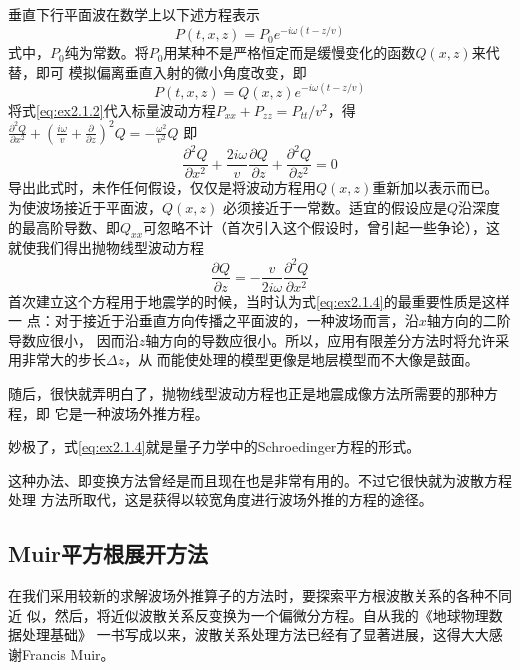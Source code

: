 垂直下行平面波在数学上以下述方程表示
\begin{equation}
P(t,x,z)=P_0e^{-i\omega (t-z/v)}
\label{eq:ex2.1.1}
\end{equation}
式中，$P_0$纯为常数。将$P_0$用某种不是严格恒定而是缓慢变化的函数$Q(x,z)$来代替，即可
模拟偏离垂直入射的微小角度改变，即
\begin{equation}
P(t,x,z)=Q(x,z)e^{-i\omega (t-z/v)}
\label{eq:ex2.1.2}
\end{equation}
将式\ref{eq:ex2.1.2}代入标量波动方程$P_{xx}+P_{zz}=P_{tt}/v^2$，得
$\frac{\partial^2 Q }{\partial x^2}+(\frac{i\omega}{v}+\frac{\partial}{\partial z})^2Q
=-\frac{\omega^2}{v^2}Q$
即
\begin{equation}
\frac{\partial^2 Q }{\partial x^2}+\frac{2i\omega}{v}\frac{\partial Q}{\partial z}+\frac{\partial^2 Q}
{\partial z^2}=0
\label{eq:ex2.1.3}
\end{equation}
导出此式时，未作任何假设，仅仅是将波动方程用$Q(x,z)$重新加以表示而已。为使波场接近于平面波，$Q(x,z)$
必须接近于一常数。适宜的假设应是$Q$沿深度的最高阶导数、即$Q_{xx}$可忽略不计（首次引入这个假设时，曾引起一些争论），这就使我们得出抛物线型波动方程
\begin{equation}
\frac{\partial Q }{\partial z}=-\frac{v}{2i\omega}\frac{\partial^2 Q }{\partial x^2}
\label{eq:ex2.1.4}
\end{equation}
首次建立这个方程用于地震学的时候，当时认为式\ref{eq:ex2.1.4}的最重要性质是这样一
点：对于接近于沿垂直方向传播之平面波的，一种波场而言，沿$x$轴方向的二阶导数应很小，
因而沿$z$轴方向的导数应很小。所以，应用有限差分方法时将允许采用非常大的步长$\Delta z$，从
而能使处理的模型更像是地层模型而不大像是鼓面。

随后，很快就弄明白了，抛物线型波动方程也正是地震成像方法所需要的那种方程，即
它是一种波场外推方程。

妙极了，式\ref{eq:ex2.1.4}就是量子力学中的Schroedinger方程的形式。

这种办法、即变换方法曾经是而且现在也是非常有用的。不过它很快就为波散方程处理
方法所取代，这是获得以较宽角度进行波场外推的方程的途径。
\subsection{Muir平方根展开方法}
在我们采用较新的求解波场外推算子的方法时，要探索平方根波散关系的各种不同近
似，然后，将近似波散关系反变换为一个偏微分方程。自从我的《地球物理数据处理基础》
一书写成以来，波散关系处理方法已经有了显著进展，这得大大感谢Francis
Muir。

